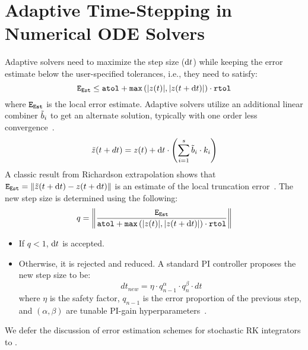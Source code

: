 \section{Adaptive Time-Stepping in Numerical ODE Solvers}
\label{sec:adaptive_time_stepping}



Adaptive solvers need to maximize the step size ($\mathrm{d}t$) while keeping the error estimate below the user-specified tolerances, i.e., they need to satisfy:
%
\begin{equation}
  \texttt{E}_{\texttt{Est}} \leq \texttt{atol} + \texttt{max}\left( |z(t)|, |z(t + \mathrm{d}t)|\right) \cdot \texttt{rtol}
\end{equation}
%
where $\texttt{E}_{\texttt{Est}}$ is the local error estimate. Adaptive solvers utilize an additional linear combiner $\Tilde{b}_i$ to get an alternate solution, typically with one order less convergence~\citep{wanner1996solving, fehlberg1968classical, dormand1980family,tsitouras2011runge}.
%
\begin{equation}
  \Tilde{z}(t + dt) = z(t) + \mathrm{d}t \cdot \left( \sum_{i = 1}^s \Tilde{b}_i \cdot k_i \right)
\end{equation}
%
A classic result from Richardson extrapolation shows that $\texttt{E}_{\texttt{Est}} = \| \Tilde{z}(t + \mathrm{d}t) - z(t + \mathrm{d}t) \|$ is an estimate of the local truncation error~\citep{hairer1, ascher1998computer}. The new step size is determined using the following:
%
\begin{equation}
  q = \left\| \frac{\texttt{E}_{\texttt{Est}}}{\texttt{atol} + \texttt{max}\left( |z(t)|, |z(t + \mathrm{d}t)|\right) \cdot \texttt{rtol}} \right\|
\end{equation}
%
\begin{itemize}
  \item If $q < 1$, $\mathrm{d}t$ is accepted.
  \item Otherwise, it is rejected and reduced. A standard PI controller proposes the new step size to be:
        \begin{equation}
          dt_{new} = \eta \cdot q_{n - 1}^\alpha \cdot q_{n}^\beta \cdot dt
        \end{equation}
        where $\eta$ is the safety factor, $q_{n - 1}$ is the error proportion of the previous step, and $(\alpha, \beta)$ are tunable PI-gain hyperparameters~\cite{wanner1996solving}.
\end{itemize}

We defer the discussion of error estimation schemes for stochastic RK integrators to  \citet{rackauckas2017adaptive, rackauckas2020sosri}.

